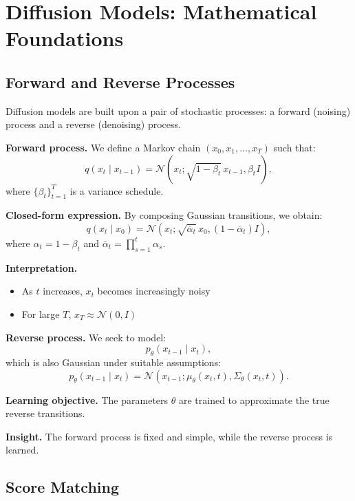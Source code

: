 \chapter{Diffusion Models: Mathematical Foundations}

\section{Forward and Reverse Processes}

Diffusion models are built upon a pair of stochastic processes: a forward (noising) process and a reverse (denoising) process.

\medskip

\noindent
\textbf{Forward process.}  
We define a Markov chain $(x_0, x_1, \dots, x_T)$ such that:
\[
q(x_t \mid x_{t-1}) = \mathcal{N}(x_t; \sqrt{1 - \beta_t}\, x_{t-1}, \beta_t I),
\]
where $\{\beta_t\}_{t=1}^T$ is a variance schedule.

\medskip

\noindent
\textbf{Closed-form expression.}  
By composing Gaussian transitions, we obtain:
\[
q(x_t \mid x_0)
=
\mathcal{N}(x_t; \sqrt{\bar{\alpha}_t}\, x_0, (1 - \bar{\alpha}_t) I),
\]
where $\alpha_t = 1 - \beta_t$ and $\bar{\alpha}_t = \prod_{s=1}^t \alpha_s$.

\medskip

\noindent
\textbf{Interpretation.}
\begin{itemize}
    \item As $t$ increases, $x_t$ becomes increasingly noisy
    \item For large $T$, $x_T \approx \mathcal{N}(0, I)$
\end{itemize}

\medskip

\noindent
\textbf{Reverse process.}  
We seek to model:
\[
p_\theta(x_{t-1} \mid x_t),
\]
which is also Gaussian under suitable assumptions:
\[
p_\theta(x_{t-1} \mid x_t)
=
\mathcal{N}(x_{t-1}; \mu_\theta(x_t, t), \Sigma_\theta(x_t, t)).
\]

\medskip

\noindent
\textbf{Learning objective.}  
The parameters $\theta$ are trained to approximate the true reverse transitions.

\medskip

\noindent
\textbf{Insight.}  
The forward process is fixed and simple, while the reverse process is learned.

\section{Score Matching}

